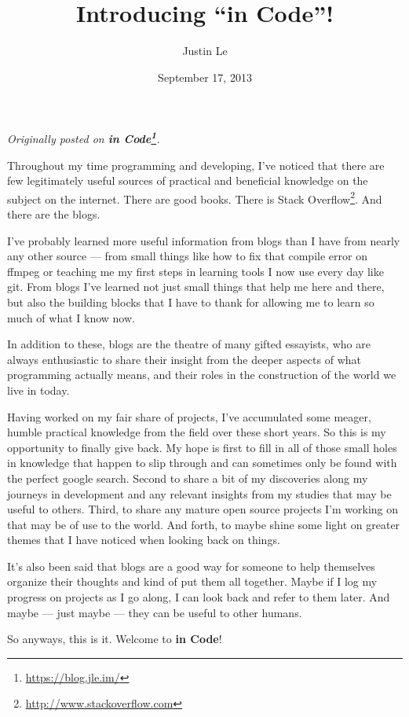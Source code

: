 \documentclass[]{article}
\title{Introducing ``in Code''!}
\author{Justin Le}
\date{September 17, 2013}
\renewcommand{\href}[2]{#2\footnote{\url{#1}}}
\begin{document}
\maketitle

\emph{Originally posted on \textbf{\href{https://blog.jle.im/}{in
Code}}.}

Throughout my time programming and developing, I've noticed that there
are few legitimately useful sources of practical and beneficial
knowledge on the subject on the internet. There are good books. There is
\href{http://www.stackoverflow.com}{Stack Overflow}. And there are the
blogs.

I've probably learned more useful information from blogs than I have
from nearly any other source --- from small things like how to fix that
compile error on ffmpeg or teaching me my first steps in learning tools
I now use every day like git. From blogs I've learned not just small
things that help me here and there, but also the building blocks that I
have to thank for allowing me to learn so much of what I know now.

In addition to these, blogs are the theatre of many gifted essayists,
who are always enthusiastic to share their insight from the deeper
aspects of what programming actually means, and their roles in the
construction of the world we live in today.

Having worked on my fair share of projects, I've accumulated some
meager, humble practical knowledge from the field over these short
years. So this is my opportunity to finally give back. My hope is first
to fill in all of those small holes in knowledge that happen to slip
through and can sometimes only be found with the perfect google search.
Second to share a bit of my discoveries along my journeys in development
and any relevant insights from my studies that may be useful to others.
Third, to share any mature open source projects I'm working on that may
be of use to the world. And forth, to maybe shine some light on greater
themes that I have noticed when looking back on things.

It's also been said that blogs are a good way for someone to help
themselves organize their thoughts and kind of put them all together.
Maybe if I log my progress on projects as I go along, I can look back
and refer to them later. And maybe --- just maybe --- they can be useful
to other humans.

So anyways, this is it. Welcome to \textbf{in Code}!
\end{document}
